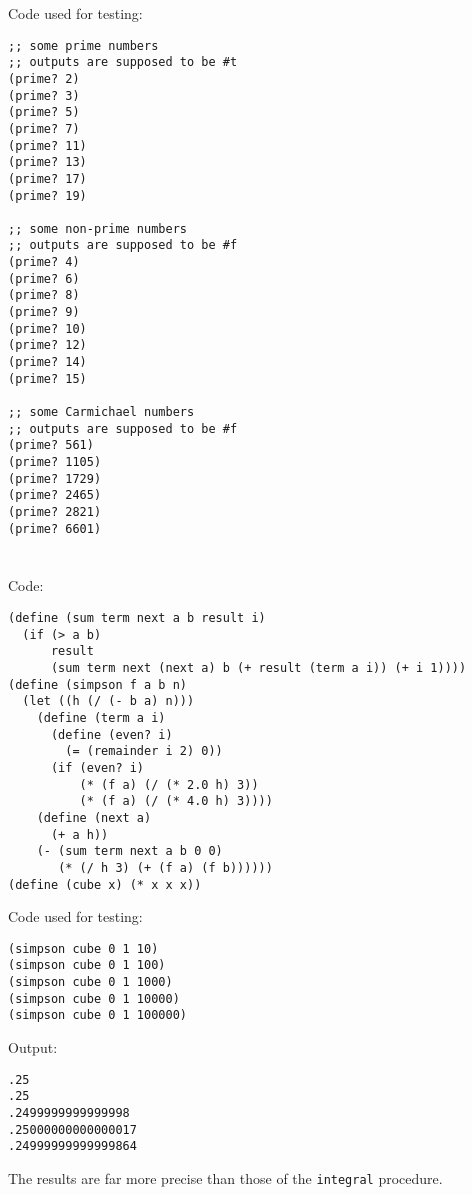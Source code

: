 \documentclass[../main.tex]{subfiles}
\begin{document}
Code used for testing:

\begin{lstlisting}
;; some prime numbers
;; outputs are supposed to be #t
(prime? 2)
(prime? 3)
(prime? 5)
(prime? 7)
(prime? 11)
(prime? 13)
(prime? 17)
(prime? 19)

;; some non-prime numbers
;; outputs are supposed to be #f
(prime? 4)
(prime? 6)
(prime? 8)
(prime? 9)
(prime? 10)
(prime? 12)
(prime? 14)
(prime? 15)

;; some Carmichael numbers
;; outputs are supposed to be #f
(prime? 561)
(prime? 1105)
(prime? 1729)
(prime? 2465)
(prime? 2821)
(prime? 6601)
\end{lstlisting}


\section{}

Code:

\begin{lstlisting}
(define (sum term next a b result i)
  (if (> a b)
      result
      (sum term next (next a) b (+ result (term a i)) (+ i 1))))
(define (simpson f a b n)
  (let ((h (/ (- b a) n)))
    (define (term a i)
      (define (even? i)
        (= (remainder i 2) 0))
      (if (even? i)
          (* (f a) (/ (* 2.0 h) 3))
          (* (f a) (/ (* 4.0 h) 3))))
    (define (next a)
      (+ a h))
    (- (sum term next a b 0 0)
       (* (/ h 3) (+ (f a) (f b))))))
(define (cube x) (* x x x))
\end{lstlisting}

Code used for testing:

\begin{lstlisting}
(simpson cube 0 1 10)
(simpson cube 0 1 100)
(simpson cube 0 1 1000)
(simpson cube 0 1 10000)
(simpson cube 0 1 100000)
\end{lstlisting}

Output:

\begin{lstlisting}
.25
.25
.2499999999999998
.25000000000000017
.24999999999999864
\end{lstlisting}

The results are far more precise than
 those of the \lstinline{integral}
 procedure.


\section{}
\end{document}
